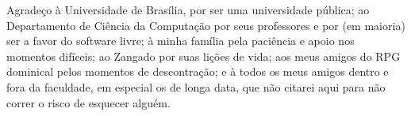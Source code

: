 
Agradeço à Universidade de Brasília, por ser uma universidade pública; ao Departamento de Ciência da Computação por seus professores e por (em maioria) ser a favor do software livre; à minha família pela paciência e apoio nos momentos difíceis; ao Zangado por suas lições de vida; aos meus amigos do RPG dominical pelos momentos de descontração; e à todos os meus amigos dentro e fora da faculdade, em especial os de longa data, que não citarei aqui para não correr o risco de esquecer alguém.